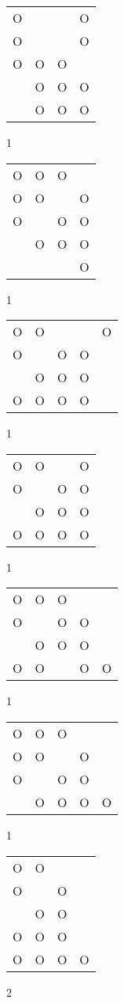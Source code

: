 \begin{tabular}{|m{0.2cm}m{0.2cm}m{0.2cm}m{0.2cm}|}\hline
O& & &O\\
O& & &O\\
O&O&O& \\
 &O&O&O\\
 &O&O&O\\
\hline\end{tabular}1
\begin{tabular}{|m{0.2cm}m{0.2cm}m{0.2cm}m{0.2cm}|}\hline
O&O&O& \\
O&O& &O\\
O& &O&O\\
 &O&O&O\\
 & & &O\\
\hline\end{tabular}1
\begin{tabular}{|m{0.2cm}m{0.2cm}m{0.2cm}m{0.2cm}m{0.2cm}|}\hline
O&O& & &O\\
O& &O&O& \\
 &O&O&O& \\
O&O&O&O& \\
\hline\end{tabular}1
\begin{tabular}{|m{0.2cm}m{0.2cm}m{0.2cm}m{0.2cm}|}\hline
O&O& &O\\
O& &O&O\\
 &O&O&O\\
O&O&O&O\\
\hline\end{tabular}1
\begin{tabular}{|m{0.2cm}m{0.2cm}m{0.2cm}m{0.2cm}m{0.2cm}|}\hline
O&O&O& & \\
O& &O&O& \\
 &O&O&O& \\
O&O& &O&O\\
\hline\end{tabular}1
\begin{tabular}{|m{0.2cm}m{0.2cm}m{0.2cm}m{0.2cm}m{0.2cm}|}\hline
O&O&O& & \\
O&O& &O& \\
O& &O&O& \\
 &O&O&O&O\\
\hline\end{tabular}1
\begin{tabular}{|m{0.2cm}m{0.2cm}m{0.2cm}m{0.2cm}|}\hline
O&O& & \\
O& &O& \\
 &O&O& \\
O&O&O& \\
O&O&O&O\\
\hline\end{tabular}2
